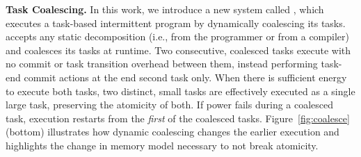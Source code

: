 

\textbf{Task Coalescing.} In this work, we introduce a new system called \sys, which executes a task-based
intermittent program by dynamically coalescing its tasks.
\sys accepts any static decomposition (i.e., from the programmer or from a compiler) 
and coalesces its tasks at runtime. Two consecutive, coalesced tasks execute  
with no commit or task transition overhead between them, instead performing
task-end commit actions at the end second task only.
%
When there is sufficient energy to execute both tasks, two distinct, small
tasks are effectively executed as a single large task, preserving the atomicity
of both.  If power fails during a coalesced task, execution restarts from the
{\em first} of the coalesced tasks.  Figure~\ref{fig:coalesce} (bottom)
illustrates how dynamic coalescing changes the earlier execution and highlights
the change in memory model necessary to not break atomicity.


